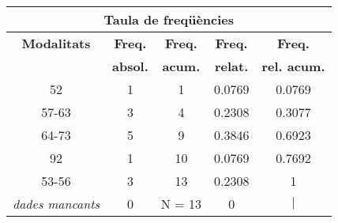 \begin{center}
\begin{tabular}{|c|c|c|c|@{}c@{}|}
\hline
\multicolumn{5}{|c|}{\bf Taula de freq\" u\`encies} \\ 
\hline
{\bf Modalitats} & {\bf Freq.} & {\bf Freq.} & {\bf Freq.} & {\bf Freq.} \\ 
 & {\bf absol.} & {\bf acum.} & {\bf relat.} & {\bf rel. acum.} \\ 
\hline
\hline
52 & 1 & 1 & 0.0769 & 0.0769 \\ 
57-63 & 3 & 4 & 0.2308 & 0.3077 \\ 
64-73 & 5 & 9 & 0.3846 & 0.6923 \\ 
92 & 1 & 10 & 0.0769 & 0.7692 \\ 
53-56 & 3 & 13 & 0.2308 & 1 \\ 
\hline
\hline
\it dades mancants & 0 & N = 13 & 0 & \colorbox{gris}{\color{gris}$|$ \hspace{11ex}} \\ 
\hline
\end{tabular}
\end{center} \vfill


